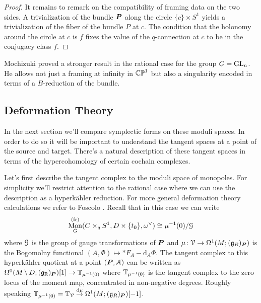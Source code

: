 \documentclass[10pt, oneside]{article}
\DeclareMathOperator{\mon}{Mon}
\renewcommand{\d}{\mathrm{d}}
\newcommand{\fr}{\mathrm{fr}}
\begin{document}
\begin{proof}
It remains to remark on the compatibility of framing data on the two sides.  A trivialization of the bundle $\boldsymbol{P}$ along the circle $\{c\} \times S^1$ yields a trivialization of the fiber of the bundle $P$ at $c$.  The condition that the holonomy around the circle at $c$ is $f$ fixes the value of the $q$-connection at $c$ to be in the conjugacy class $f$.

\end{proof}

\begin{remark}
Mochizuki \cite{Mochizuki} proved a stronger result in the rational case for the group $G = \mathrm{GL}_n$.  He allows not just a framing at infinity in $\mathbb{CP}^1$ but also a singularity encoded in terms of a $B$-reduction of the bundle. 
\end{remark}

\subsection{Deformation Theory} \label{def_section}

 

In the next section we'll compare symplectic forms on these moduli spaces.  In order to do so it will be important to understand the tangent spaces at a point of the source and target.  There's a natural description of these tangent spaces in terms of the hypercohomology of certain cochain complexes.

Let's first describe the tangent complex to the moduli space of monopoles.  For simplicity we'll restrict attention to the rational case where we can use the description as a hyperk\"ahler reduction.  For more general deformation theory calculations we refer to Foscolo \cite{FoscoloDef}.  Recall that in this case we can write
\[\mon^{(\fr)}_G(C \times_q S^1, D \times \{t_0\}, \omega^\vee) \iso \mu^{-1}(0)/ \mc G\]
where $\mathcal{G}$ is the group of gauge transformations of $\boldsymbol{P}$ and $\mu \colon \mathcal{V} \to \Omega^1(M; (\mathfrak{g}_R)_{\boldsymbol{P}})$ is the Bogomolny functional $(A,\Phi) \mapsto \ast F_A - \d_A \Phi$.  The tangent complex to this hyperk\"ahler quotient at a point $(\boldsymbol{P}, \mathcal{A})$ can be written as $\Omega^0(M \!\ \backslash \ \! D; (\mathfrak{g}_{\mathbb{R}})_{\boldsymbol{P}})[1] \to \mathbb{T}_{\mu^{-1}(0)}$ where $\mathbb{T}_{\mu^{-1}(0)}$ is the tangent complex to the zero locus of the moment map, concentrated in non-negative degrees. Roughly speaking $\bb T_{\mu^{-1}(0)} = \bb T_{\mc V} \overset {\d\mu} \to \Omega^1(M; (\gg_R)_{\bo P})[-1]$.  
\end{document}
